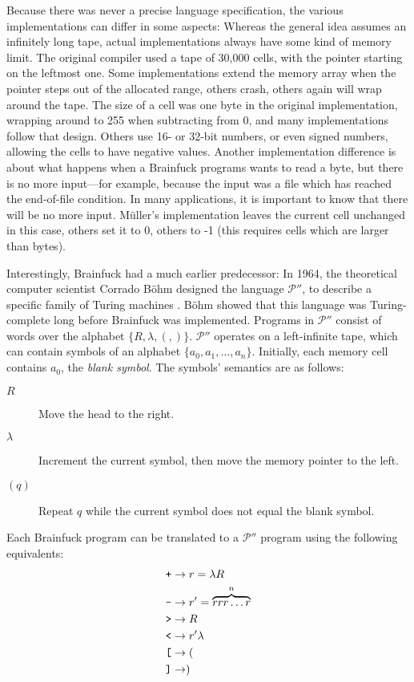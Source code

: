 Because there was never a precise language specification, the various implementations can differ in some aspects:
Whereas the general idea assumes an infinitely long tape, actual implementations always have some kind of memory limit. The original compiler used a tape of 30,000 cells, with the pointer starting on the leftmost one. Some implementations extend the memory array when the pointer steps out of the allocated range, others crash, others again will wrap around the tape.
The size of a cell was one byte in the original implementation, wrapping around to 255 when subtracting from 0, and many implementations follow that design. Others use 16- or 32-bit numbers, or even signed numbers, allowing the cells to have negative values.
Another implementation difference is about what happens when a Brainfuck programs wants to read a byte, but there is no more input---for example, because the input was a file which has reached the end-of-file condition. In many applications, it is important to know that there will be no more input. Müller's implementation leaves the current cell unchanged in this case, others set it to 0, others to -1 (this requires cells which are larger than bytes).

\label{pprimeprime}

Interestingly, Brainfuck had a much earlier predecessor: In 1964, the theoretical computer scientist Corrado Böhm designed the language $\mathcal{P}''$, to describe a specific family of Turing machines \cite{bohm1964family}. Böhm showed that this language was Turing-complete long before Brainfuck was implemented. Programs in $\mathcal{P}''$ consist of words over the alphabet $\{R, \lambda, (, )\}$. $\mathcal{P}''$ operates on a left-infinite tape, which can contain symbols of an alphabet $\{a_0, a_1, \dots, a_n\}$. Initially, each memory cell contains $a_0$, the \emph{blank symbol}. The symbols' semantics are as follows:

\begin{description}
    \item[\boldmath$R$] Move the head to the right.
    \item[\boldmath$\lambda$] Increment the current symbol, then move the memory pointer to the left.
    \item[\boldmath$(q)$] Repeat $q$ while the current symbol does not equal the blank symbol.
\end{description}

Each Brainfuck program can be translated  to a $\mathcal{P}''$ program using the following equivalents:
\begin{align*}
    \text{\texttt{+}} &\rightarrow r = \lambda R\\
    \text{\texttt{-}} &\rightarrow r' = \overbrace{rrr\dots r}^n\\
    \text{\texttt{>}} &\rightarrow R\\
    \text{\texttt{<}} &\rightarrow r'\lambda\\
    \text{\texttt{[}} &\rightarrow (\\
    \text{\texttt{]}} &\rightarrow )
\end{align*}

